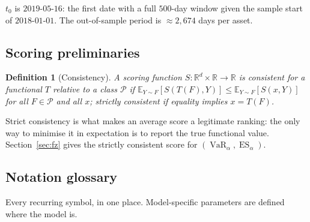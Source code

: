 \documentclass[11pt,a4paper]{article}
\newcommand{\R}{\mathbb{R}}
\newcommand{\E}{\mathbb{E}}
\newcommand{\VaR}{\operatorname{VaR}}
\newcommand{\ES}{\operatorname{ES}}
\newtheorem{definition}{Definition}
\begin{document}
$t_0$ is $2019$-$05$-$16$: the first date with a full $500$-day window given the
sample start of $2018$-$01$-$01$. The out-of-sample period is $\approx 2{,}674$
days per asset.

\subsection{Scoring preliminaries}

\begin{definition}[Consistency]
A scoring function $S:\R^d\times\R\to\R$ is \emph{consistent} for a functional
$T$ relative to a class $\mathcal P$ if
$\E_{Y\sim F}[S(T(F),Y)] \le \E_{Y\sim F}[S(x,Y)]$ for all $F\in\mathcal P$ and
all $x$; \emph{strictly} consistent if equality implies $x = T(F)$.
\end{definition}
Strict consistency is what makes an average score a legitimate ranking: the only
way to minimise it in expectation is to report the true functional value.
Section~\ref{sec:fz} gives the strictly consistent score for
$(\VaR_\alpha,\ES_\alpha)$.

\subsection{Notation glossary}\label{sec:notation}

Every recurring symbol, in one place. Model-specific parameters are defined
where the model is.
\end{document}
